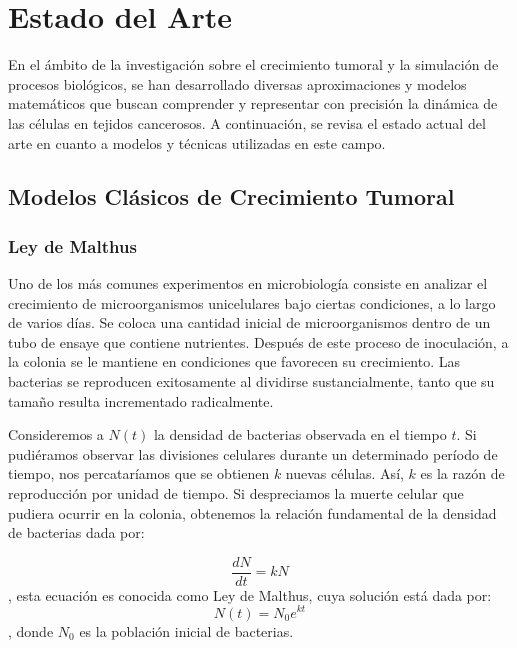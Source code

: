 \chapter{Estado del Arte}\label{chapter:state-of-the-art}

En el ámbito de la investigación sobre el crecimiento tumoral y la simulación de procesos biológicos, se han desarrollado diversas aproximaciones y modelos matemáticos que buscan comprender y representar con precisión la dinámica de las células en tejidos cancerosos. A continuación, se revisa el estado actual del arte en cuanto a modelos y técnicas utilizadas en este campo.

\section{Modelos Clásicos de Crecimiento Tumoral}

\subsection{Ley de Malthus}

Uno de los más comunes experimentos en microbiología consiste en analizar el crecimiento de microorganismos unicelulares bajo ciertas condiciones, a lo largo de varios días. Se coloca una cantidad inicial de microorganismos dentro de un tubo de ensaye que contiene nutrientes. Después de este proceso de inoculación, a la colonia se le mantiene en condiciones que favorecen su crecimiento. Las bacterias se reproducen exitosamente al dividirse sustancialmente, tanto que su tamaño resulta incrementado radicalmente.

Consideremos a $N(t)$ la densidad de bacterias observada en el tiempo $t$. Si pudiéramos observar las divisiones celulares durante un determinado período de tiempo, nos percataríamos que se obtienen $k$ nuevas células. Así, $k$ es la razón de reproducción por unidad de tiempo. Si despreciamos la muerte celular que pudiera ocurrir en la colonia, obtenemos la relación fundamental de la densidad de bacterias dada por:

\begin{equation}
    \frac{dN}{dt} = kN
\end{equation}
, esta ecuaci\'on es conocida como Ley de Malthus, cuya soluci\'on est\'a dada por:
\begin{equation}
    N(t) = N_{0}e^{kt}
\end{equation}
, donde $N_{0}$ es la poblaci\'on inicial de bacterias.

